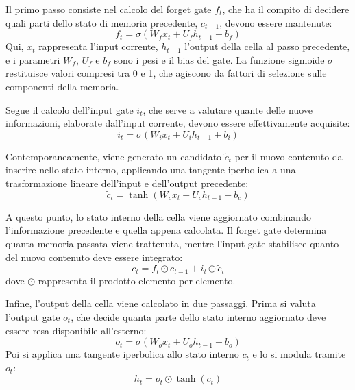 \documentclass{article}
\begin{document}
Il primo passo consiste nel calcolo del forget gate $f_t$, che ha il compito di decidere quali parti dello stato di memoria precedente, $c_{t-1}$, devono essere mantenute:
\begin{equation}
f_t = \sigma(W_f x_t + U_f h_{t-1} + b_f)
\end{equation}
Qui, $x_t$ rappresenta l’input corrente, $h_{t-1}$ l’output della cella al passo precedente, e i parametri $W_f$, $U_f$ e $b_f$ sono i pesi e il bias del gate. La funzione sigmoide $\sigma$ restituisce valori compresi tra 0 e 1, che agiscono da fattori di selezione sulle componenti della memoria.

Segue il calcolo dell’input gate $i_t$, che serve a valutare quante delle nuove informazioni, elaborate dall’input corrente, devono essere effettivamente acquisite:
\begin{equation}
i_t = \sigma(W_i x_t + U_i h_{t-1} + b_i)
\end{equation}

Contemporaneamente, viene generato un candidato $\tilde{c}_t$ per il nuovo contenuto da inserire nello stato interno, applicando una tangente iperbolica a una trasformazione lineare dell’input e dell’output precedente:
\begin{equation}
\tilde{c}_t = \tanh(W_c x_t + U_c h_{t-1} + b_c)
\end{equation}

A questo punto, lo stato interno della cella viene aggiornato combinando l’informazione precedente e quella appena calcolata. Il forget gate determina quanta memoria passata viene trattenuta, mentre l’input gate stabilisce quanto del nuovo contenuto deve essere integrato:
\begin{equation}
c_t = f_t \odot c_{t-1} + i_t \odot \tilde{c}_t
\end{equation}
dove $\odot$ rappresenta il prodotto elemento per elemento.

Infine, l’output della cella viene calcolato in due passaggi. Prima si valuta l’output gate $o_t$, che decide quanta parte dello stato interno aggiornato deve essere resa disponibile all’esterno:
\begin{equation}
o_t = \sigma(W_o x_t + U_o h_{t-1} + b_o)
\end{equation}
Poi si applica una tangente iperbolica allo stato interno $c_t$ e lo si modula tramite $o_t$:
\begin{equation}
h_t = o_t \odot \tanh(c_t)
\end{equation}
\end{document}
